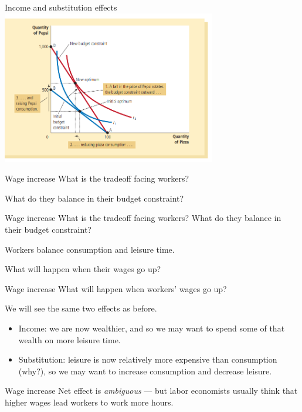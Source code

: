 \documentclass[aspectratio=169]{beamer}
\begin{document}
\begin{frame}{Income and substitution effects}
    \centering
        \includegraphics[width = 0.7\textwidth,keepaspectratio]{effects.png}
\end{frame}

\begin{frame}{Wage increase}
    What is the tradeoff facing workers?

    \vspace{2mm}

    What do they balance in their budget constraint?
\end{frame}

\begin{frame}{Wage increase}
    What is the tradeoff facing workers?  What do they balance in their budget constraint?

    \vspace{2mm}

    Workers balance consumption and leisure time.

    \vspace{2mm}

    What will happen when their wages go up?

\end{frame}

\begin{frame}{Wage increase}
    What will happen when workers' wages go up?

    \vspace{2mm}

    We will see the same two effects as before.
    \begin{itemize}
        \item Income: we are now wealthier, and so we may want to spend some of that wealth on more leisure time.
        \item Substitution: leisure is now relatively more expensive than consumption (why?), so we may want to increase consumption and decrease leisure.
    \end{itemize}
 
\end{frame}

\begin{frame}{Wage increase}
    Net effect is \textit{ambiguous} --- but labor economists usually think that higher wages lead workers to work more hours. 
\end{frame}
\end{document}
